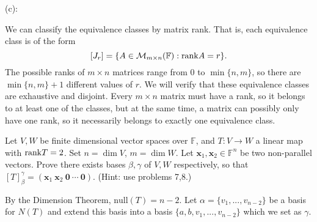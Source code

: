 \documentclass{eh-homework}
\begin{document}
\begin{question}{9}
        \medskip

        (c):

        We can classify the equivalence classes by matrix rank. That is, each equivalence class is of the form
        \[
            [J_r] = \{ A \in \mathcal{M} _{m\times n}(\mathbb{F}) : \mathrm{rank} A = r\}.
        \]
        The possible ranks of \(m\times n\) matrices range from \(0\) to \(\min \{ n,m \}\), so there are \(\min \{ n,m \} + 1\) different values of \(r\). We will verify that these equivalence classes are exhaustive and disjoint. Every \(m \times n\) matrix must have a rank, so it belongs to at least one of the classes, but at the same time, a matrix can possibly only have one rank, so it necessarily belongs to exactly one equivalence class.
    \end{question}

    \begin{question}{10}
        Let \( V, W \) be finite dimensional vector spaces over \( \mathbb{F} \), and \( T : V \to W \) a linear map with \(\mathrm{rank} T = 2\). Set \( n = \dim V \), \( m = \dim W \). Let \( \mathbf{x}_1, \mathbf{x}_2 \in \mathbb{F}^n \) be two non-parallel vectors. Prove there exists bases \( \beta, \gamma \) of \( V, W \) respectively, so that \( [T]_\beta^\gamma = (\mathbf{x}_1 \ \mathbf{x}_2 \ \mathbf{0} \ \cdots \ \mathbf{0}) \). (Hint: use problems 7,8.)

        \tcblower

        By the Dimension Theorem, \(\mathrm{null}(T) = n-2 \). Let \(\alpha = \{ v_1, ..., v_{n-2} \}\) be a basis for \(N(T)\) and extend this basis into a basis \(\{ a, b, v_1, ..., v_{n-2}\}\) which we set as \(\gamma\).
    \end{question}
\end{document}
